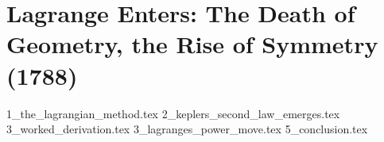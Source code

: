 \section{Lagrange Enters: The Death of Geometry, the Rise of Symmetry (1788)}


{1_the_lagrangian_method.tex}
{2_keplers_second_law_emerges.tex}
{3_worked_derivation.tex}
{3_lagranges_power_move.tex}
{5_conclusion.tex}